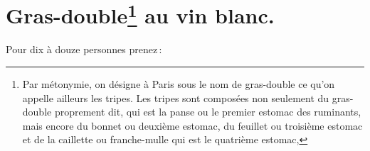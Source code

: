 \section*{\centering Gras-double\footnote{Par métonymie, on désigne à Paris
sous le nom de gras-double ce qu'on appelle ailleurs les tripes. Les tripes
sont composées non seulement du gras-double proprement dit, qui est la panse ou
le premier estomac des ruminants, mais encore du bonnet ou deuxième estomac, du
feuillet ou troisième estomac et de la caillette ou franche-mulle qui est le
quatrième estomac,} au vin blanc.}

\label{pg0406} \hypertarget{p0406}{}

Pour dix à douze personnes prenez :

\medskip

